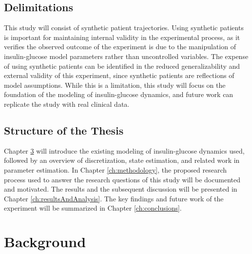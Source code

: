 \documentclass[nomenclature, english, bibtex]{kththesis}
\newcommand*{\generalExpl}[1]{\todo[inline]{#1}}
\newcommand*{\sweExpl}[1]{\todo[inline, backgroundcolor=kth-lightblue40]{#1}}  %
\begin{document}
\section{Delimitations}

This study will consist of synthetic patient trajectories. Using synthetic patients is important for maintaining internal validity in the experimental process, as it verifies the observed outcome of the experiment is due to the manipulation of insulin-glucose model parameters rather than uncontrolled variables. The expense of using synthetic patients can be identified in the reduced generalizability and external validity of this experiment, since synthetic patients are reflections of model assumptions. While this is a limitation, this study will focus on the foundation of the modeling of insulin-glucose dynamics, and future work can replicate the study with real clinical data. 

\section{Structure of the Thesis}
Chapter \ref{ch:background} will introduce the existing modeling of insulin-glucose dynamics used, followed by an overview of discretization, state estimation, and related work in parameter estimation. In Chapter \ref{ch:methodology}, the proposed research process used to answer the research questions of this study will be documented and motivated. The results and the subsequent discussion will be presented in Chapter \ref{ch:resultsAndAnalysis}. The key findings and future work of the experiment will be summarized in Chapter \ref{ch:conclusions}.

\cleardoublepage
\chapter{Background}
\label{ch:background}
\end{document}
